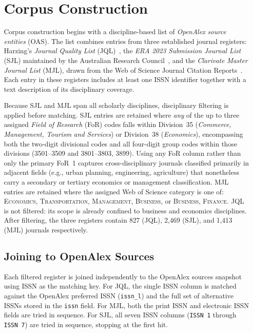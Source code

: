 \section{Corpus Construction}
\label{sec:corpus}

Corpus construction begins with a discipline-based list of \textit{OpenAlex source entities} (OAS).
The list combines entries from three established journal registers:
Harzing's \textit{Journal Quality List} (JQL)~\cite{harzing_jql},
the \textit{ERA 2023 Submission Journal List} (SJL) maintained by the Australian Research Council~\cite{arc_era2023},
and the \textit{Clarivate Master Journal List} (MJL), drawn from the Web of Science Journal Citation Reports~\cite{clarivate_mjl}.
Each entry in these registers includes at least one ISSN identifier together with a text description of its disciplinary coverage.

Because SJL and MJL span all scholarly disciplines, disciplinary filtering is applied before matching.
SJL entries are retained where \textit{any} of the up to three assigned \textit{Field of Research}
(FoR) codes falls within Division~35 (\textit{Commerce, Management, Tourism and Services}) or
Division~38 (\textit{Economics}), encompassing both the two-digit divisional codes and all
four-digit group codes within those divisions (3501--3509 and 3801--3803, 3899).
Using any FoR column rather than only the primary FoR~1 captures cross-disciplinary journals
classified primarily in adjacent fields (e.g., urban planning, engineering, agriculture) that
nonetheless carry a secondary or tertiary economics or management classification.
MJL entries are retained where the assigned Web of Science category is one of:
\textsc{Economics}, \textsc{Transportation}, \textsc{Management}, \textsc{Business},
or \textsc{Business, Finance}.
JQL is not filtered: its scope is already confined to business and economics disciplines.
After filtering, the three registers contain 827 (JQL), 2{,}469 (SJL), and 1{,}413 (MJL) journals respectively.

\subsection{Joining to OpenAlex Sources}

Each filtered register is joined independently to the OpenAlex sources snapshot
using ISSN as the matching key.
For JQL, the single ISSN column is matched against the OpenAlex preferred ISSN
(\texttt{issn\_l}) and the full set of alternative ISSNs stored in the \texttt{issn} field.
For MJL, both the print ISSN and electronic ISSN fields are tried in sequence.
For SJL, all seven ISSN columns ({\small\texttt{ISSN~1}} through {\small\texttt{ISSN~7}}) are tried in sequence,
stopping at the first hit.

